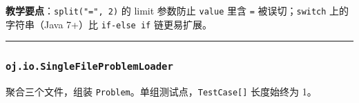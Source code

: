 \documentclass[
  11pt,
]{ctexart}
\begin{document}
\textbf{教学要点}：\texttt{split("=",\ 2)} 的 limit 参数防止
\texttt{value} 里含 \texttt{=} 被误切；\texttt{switch} 上的字符串（Java
7+）比 \texttt{if-else\ if} 链更易扩展。

\begin{center}\rule{0.5\linewidth}{0.5pt}\end{center}

\hypertarget{oj.io.singlefileproblemloader}{%
\subsubsection{\texorpdfstring{\texttt{oj.io.SingleFileProblemLoader}}{oj.io.SingleFileProblemLoader}}\label{oj.io.singlefileproblemloader}}

聚合三个文件，组装 \texttt{Problem}。单组测试点，\texttt{TestCase{[}{]}}
长度始终为 1。
\end{document}
